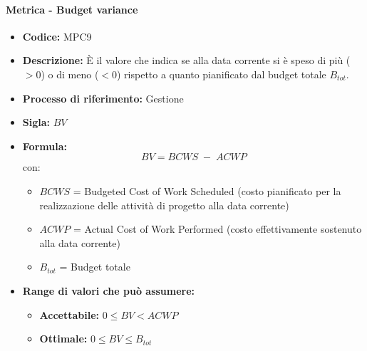     \paragraph{Metrica - Budget variance}
        \begin{itemize}
            \item \textbf{Codice:} MPC9
            \item \textbf{Descrizione:} È il valore che indica se alla data corrente si è speso di più ($>0$) o di meno ($<0$) rispetto a quanto pianificato dal budget totale $B_{tot}$.
            \item \textbf{Processo di riferimento:} Gestione
            \item \textbf{Sigla:} $BV$
            \item \textbf{Formula:} $$BV = {BCWS \; - \; ACWP}$$
            con:
            \begin{itemize}
                \item $BCWS$ = Budgeted Cost of Work Scheduled (costo pianificato per la realizzazione delle attività di progetto alla data corrente)
                \item $ACWP$ = Actual Cost of Work Performed (costo effettivamente sostenuto alla data corrente)
                \item $B_{tot}$ = Budget totale
            \end{itemize}
            \item \textbf{Range di valori che può assumere:}
            \begin{itemize}
                \item \textbf{Accettabile:} $0 \leq BV < ACWP$
                \item \textbf{Ottimale:} $0 \leq BV \leq B_{tot}$
            \end{itemize}
        \end{itemize}

\newpage %

